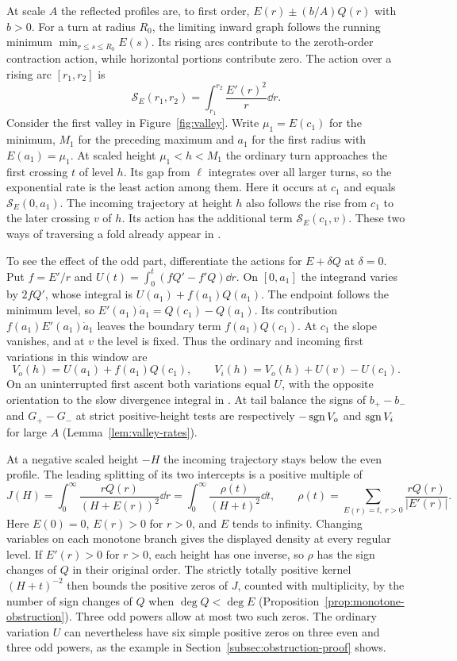 At scale $A$ the reflected profiles are, to first order,
$E(r)\pm(b/A)Q(r)$ with $b>0$. For a turn at radius $R_0$, the
limiting inward graph follows the running minimum
$\min_{r\le s\le R_0} E(s)$. Its rising arcs contribute to the
zeroth-order contraction action, while horizontal portions contribute
zero. The action over a rising arc $[r_1,r_2]$ is
\[
 \mathcal S_E(r_1,r_2)=\int_{r_1}^{r_2}\frac{E'(r)^2}{r}\dd r .
\]
Consider the first valley in Figure~\ref{fig:valley}. Write
$\mu_1=E(c_1)$ for the minimum, $M_1$ for the preceding maximum and
$a_1$ for the first radius with $E(a_1)=\mu_1$. At scaled height
$\mu_1<h<M_1$ the ordinary turn approaches the first crossing $t$ of
level $h$. Its gap from $\ell$ integrates over all larger turns, so
the exponential rate is the least action among them. Here it occurs at
$c_1$ and equals $\mathcal S_E(0,a_1)$.
The incoming trajectory at height $h$ also follows the rise from
$c_1$ to the later crossing $v$ of $h$. Its action has the additional
term $\mathcal S_E(c_1,v)$. These two ways of traversing a fold already
appear in \cite[\S3.1]{LuDegree}.



To see the effect of the odd part, differentiate the actions for
$E+\delta Q$ at $\delta=0$. Put $f=E'/r$ and
$U(t)=\int_0^t(fQ'-f'Q)\dd r$. On $[0,a_1]$ the integrand varies by
$2fQ'$, whose integral is $U(a_1)+f(a_1)Q(a_1)$.
The endpoint follows the minimum level, so
$E'(a_1)\dot a_1=Q(c_1)-Q(a_1)$. Its contribution
$f(a_1)E'(a_1)\dot a_1$ leaves the boundary term $f(a_1)Q(c_1)$.
At $c_1$ the slope vanishes, and at $v$ the level is fixed. Thus the
ordinary and incoming first variations in this window are
\[
 V_o(h)=U(a_1)+f(a_1)Q(c_1),\qquad
 V_i(h)=V_o(h)+U(v)-U(c_1).
\]
On an uninterrupted first ascent both variations equal $U$, with the
opposite orientation to the slow divergence integral in
\cite[Proposition~1]{DMH}. At tail balance the signs of
$b_+-b_-$ and $G_+-G_-$ at strict positive-height tests are respectively
$-\operatorname{sgn} V_o$ and $\operatorname{sgn} V_i$ for large $A$
(Lemma~\ref{lem:valley-rates}).

At a negative scaled height $-H$ the incoming trajectory stays below
the even profile. The leading splitting of its two intercepts is a positive multiple of
\[
 J(H)=\int_0^\infty\frac{rQ(r)}{(H+E(r))^2}\dd r
     =\int_0^\infty\frac{\rho(t)}{(H+t)^2}\dd t,\qquad
 \rho(t)=\sum_{E(r)=t,\ r>0}\frac{rQ(r)}{|E'(r)|}.
\]
Here $E(0)=0$, $E(r)>0$ for $r>0$, and $E$ tends to infinity.
Changing variables on each monotone branch gives the displayed density
at every regular level. If $E'(r)>0$ for $r>0$, each height
has one inverse, so $\rho$ has the sign changes of $Q$ in their original
order. The strictly totally positive kernel $(H+t)^{-2}$ then bounds
the positive zeros of $J$, counted with multiplicity, by the number of
sign changes of $Q$ when $\deg Q<\deg E$
(Proposition~\ref{prop:monotone-obstruction}). Three odd powers allow
at most two such zeros. The ordinary variation $U$ can nevertheless
have six simple positive zeros on three even and three odd powers,
as the example in Section~\ref{subsec:obstruction-proof} shows.

